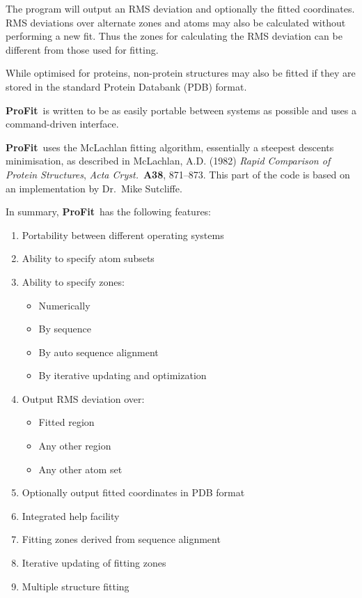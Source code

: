 \documentclass{article}
\newcommand{\pf}{\mbox{\bfseries ProFit}}
\begin{document}
The program will output an RMS deviation and optionally the fitted
coordinates.  RMS deviations over alternate zones and atoms may also
be calculated without performing a new fit. Thus the zones for
calculating the RMS deviation can be different from those used for
fitting.

While optimised for proteins, non-protein structures may also be
fitted if they are stored in the standard Protein Databank (PDB) format.

\pf\ is written to be as easily portable between systems as possible
and uses a command-driven interface. 

\pf\ uses the McLachlan fitting algorithm, essentially a steepest
descents minimisation, as described in McLachlan, A.D. (1982)
\emph{Rapid Comparison of Protein Structures}, \emph{Acta Cryst.}\
{\bfseries A38}, 871--873. This part of the code is based on an
implementation by Dr.\ Mike Sutcliffe.


In summary, \pf\ has the following features:

\begin{enumerate}
\setlength{\parsep}{0pt}
\setlength{\parskip}{0pt}
\setlength{\itemsep}{0pt}
\item Portability between different operating systems
\item Ability to specify atom subsets
\item Ability to specify zones:
\begin{itemize}
        \setlength{\parsep}{0pt}
        \setlength{\parskip}{0pt}
        \setlength{\itemsep}{0pt}
        \item Numerically
        \item By sequence
        \item By auto sequence alignment
        \item By iterative updating and optimization
\end{itemize}
\item Output RMS deviation over:
\begin{itemize}
        \setlength{\parsep}{0pt}
        \setlength{\parskip}{0pt}
        \setlength{\itemsep}{0pt}
        \item Fitted region
        \item Any other region
        \item Any other atom set
\end{itemize}
\item Optionally output fitted coordinates in PDB format
\item Integrated help facility
\item Fitting zones derived from sequence alignment
\item Iterative updating of fitting zones
\item Multiple structure fitting
\end{enumerate}
\end{document}
